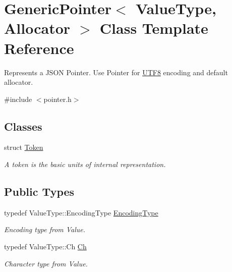 \hypertarget{classGenericPointer}{}\section{Generic\+Pointer$<$ Value\+Type, Allocator $>$ Class Template Reference}
\label{classGenericPointer}


Represents a J\+S\+ON Pointer. Use Pointer for \hyperlink{structUTF8}{U\+T\+F8} encoding and default allocator.  




{\ttfamily \#include $<$pointer.\+h$>$}

\subsection*{Classes}
\begin{DoxyCompactItemize}
\item 
struct \hyperlink{structGenericPointer_1_1Token}{Token}
\begin{DoxyCompactList}\small\item\em A token is the basic units of internal representation. \end{DoxyCompactList}\end{DoxyCompactItemize}
\subsection*{Public Types}
\begin{DoxyCompactItemize}
\item 
typedef Value\+Type\+::\+Encoding\+Type \hyperlink{classGenericPointer_a4b802da797a7a0b615fd9611cedb7c3b}{Encoding\+Type}\hypertarget{classGenericPointer_a4b802da797a7a0b615fd9611cedb7c3b}{}\label{classGenericPointer_a4b802da797a7a0b615fd9611cedb7c3b}

\begin{DoxyCompactList}\small\item\em Encoding type from Value. \end{DoxyCompactList}\item 
typedef Value\+Type\+::\+Ch \hyperlink{classGenericPointer_ab292356c11b4015c98d21b966b11f285}{Ch}\hypertarget{classGenericPointer_ab292356c11b4015c98d21b966b11f285}{}\label{classGenericPointer_ab292356c11b4015c98d21b966b11f285}

\begin{DoxyCompactList}\small\item\em Character type from Value. \end{DoxyCompactList}\end{DoxyCompactItemize}
